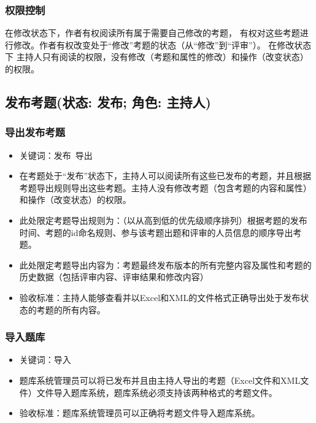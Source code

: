 \documentclass[hyperref, a4paper]{ctexart}
\begin{document}
\hypertarget{ux6743ux9650ux63a7ux5236-2}{%
\subsubsection{权限控制}\label{ux6743ux9650ux63a7ux5236-2}}

在修改状态下，作者有权阅读所有属于需要自己修改的考题，
有权对这些考题进行修改。作者有权改变处于``修改''考题的状态（从``修改''到``评审''）。
在修改状态下
主持人只有阅读的权限，没有修改（考题和属性的修改）和操作（改变状态）的权限。

\hypertarget{ux53d1ux5e03ux8003ux9898ux72b6ux6001-ux53d1ux5e03-ux89d2ux8272-ux4e3bux6301ux4eba}{%
\subsection{发布考题(状态: 发布; 角色:
主持人)}\label{ux53d1ux5e03ux8003ux9898ux72b6ux6001-ux53d1ux5e03-ux89d2ux8272-ux4e3bux6301ux4eba}}

\hypertarget{ux5bfcux51faux53d1ux5e03ux8003ux9898}{%
\subsubsection{导出发布考题}\label{ux5bfcux51faux53d1ux5e03ux8003ux9898}}

\begin{itemize}
\item
  关键词：发布~导出
\item
  在考题处于``发布''状态下，主持人可以阅读所有这些已发布的考题，并且根据考题导出规则导出这些考题。主持人没有修改考题（包含考题的内容和属性）和操作（改变状态）的权限。
\item
  此处限定考题导出规则为：（以从高到低的优先级顺序排列）根据考题的发布时间、考题的id命名规则、参与该考题出题和评审的人员信息的顺序导出考题。
\item
  此处限定考题导出内容为：考题最终发布版本的所有完整内容及属性和考题的历史数据（包括评审内容、评审结果和修改内容）
\item
  验收标准：主持人能够查看并以Excel和XML的文件格式正确导出处于发布状态的考题的所有内容。
\end{itemize}

\hypertarget{ux5bfcux5165ux9898ux5e93}{%
\subsubsection{导入题库}\label{ux5bfcux5165ux9898ux5e93}}

\begin{itemize}
\item
  关键词：导入
\item
  题库系统管理员可以将已发布并且由主持人导出的考题（Excel文件和XML文件）文件导入题库系统，题库系统必须支持该两种格式的考题文件。
\item
  验收标准：题库系统管理员可以正确将考题文件导入题库系统。
\end{itemize}
\end{document}
